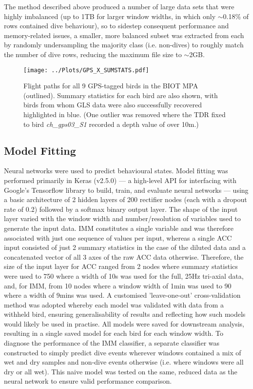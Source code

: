 \documentclass[11pt]{article}
\begin{document}
    The method described above produced a number of large data sets that were highly imbalanced (up to 1TB for larger window widths, in which only $\sim$0.18\% of rows contained dive behaviour), so to sidestep consequent performance and memory-related issues, a smaller, more balanced subset was extracted from each by randomly undersampling the majority class (i.e. non-dives) to roughly match the number of dive rows, reducing the maximum file size to $\sim$2GB. 
    
    \begin{figure}
	    \centering\texttt{[image: ../Plots/GPS\_X\_SUMSTATS.pdf]}
	    \caption{Flight paths for all 9 GPS-tagged birds in the BIOT MPA (outlined). Summary statistics for each bird are also shown, with birds from whom GLS data were also successfully recovered highlighted in blue. (One outlier was removed where the TDR fixed to bird \emph{ch\_gps03\_S1} recorded a depth value of over 10m.)}
    \end{figure}
    
    \subsection{Model Fitting}
    Neural networks were used to predict behavioural states. Model fitting was performed primarily in Keras (v2.5.0) — a high-level API for interfacing with Google's Tensorflow library to build, train, and evaluate neural networks — using a basic architecture of 2 hidden layers of 200 rectifier nodes (each with a dropout rate of 0.2) followed by a softmax binary output layer. The shape of the input layer varied with the window width and number/resolution of variables used to generate the input data. IMM constitutes a single variable and was therefore associated with just one sequence of values per input, whereas a single ACC input consisted of just 2 summary statistics in the case of the diluted data and a concatenated vector of all 3 axes of the raw ACC data otherwise. Therefore, the size of the input layer for ACC ranged from 2 nodes where summary statistics were used to 750 where a width of 10s was used for the full, 25Hz tri-axial data, and, for IMM, from 10 nodes where a window width of 1min was used to 90 where a width of 9mins was used. A customised 'leave-one-out' cross-validation method was adopted whereby each model was validated with data from a withheld bird, ensuring generalisability of results and reflecting how such models would likely be used in practise. All models were saved for downstream analysis, resulting in a single saved model for each bird for each window width. To diagnose the performance of the IMM classifier, a separate classifier was constructed to simply predict dive events wherever windows contained a mix of wet and dry samples and non-dive events otherwise (i.e. where windows were all dry or all wet). This naive model was tested on the same, reduced data as the neural network to ensure valid performance comparison. 
    
\end{document}

